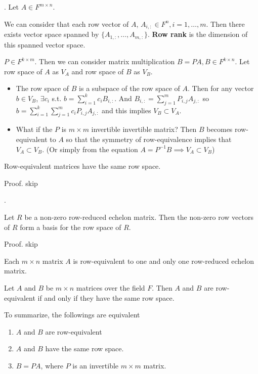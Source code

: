 \documentclass[8pt]{beamer}
\newcommand{\tb}[1]{\textbf{#1}}
\begin{document}
\begin{frame}{.}
    Let $A \in F^{m \times n}$.

    \begin{definition}
        We can consider that each row vector of $A$, $A_{i,:} \in F^{n}, i=1, \dots, m$. Then there exists vector space spanned by $\{A_{1, :}, \dots, A_{m, :}\}$. \tb{Row rank} is the dimension of this spanned vector space.
    \end{definition}

     $P \in F^{k \times m}$. Then we can consider matrix multiplication  $B = PA, B \in F^{k \times n}$. Let row space of $A$ as $V_A$ and row space of $B$ as $V_B$.

     \begin{itemize}
        \item The row space of $B$ is a subspace of the row space of $A$.
        Then for any vector $b \in V_B$, $\exists c_i$ s.t. $b = \sum_{i=1}^k c_i B_{i, :}$. 
        And $B_{i,:} = \sum_{j=1}^m P_{i, j} A_{j, :}$ so $b = \sum_{i=1}^k \sum_{j=1}^m c_i P_{i,j} A_{j, :}$ and this implies $V_B \subset V_A$.
        \item What if the $P$ is $m \times m $ invertible invertible matrix?
        Then $B$ becomes row-equivalent to $A$ so that the symmetry of row-equivalence implies that $V_A \subset V_B$. (Or simply from the equation $A = P^{-1} B \implies V_A \subset V_B$)
     \end{itemize}

     \begin{theorem}
        Row-equivalent matrices have the same row space.
     \end{theorem}
     Proof. skip
\end{frame}

\begin{frame}{.}
    \begin{theorem}
        Let $R$ be a non-zero row-reduced echelon matrix. Then the non-zero row vectors of $R$ form a basis for the row space of $R$.
    \end{theorem}
    Proof. skip

    \begin{corollary}
        Each $m \times n$ matrix $A$ is row-equivalent to one and only one row-reduced echelon matrix.
    \end{corollary}

    \begin{corollary}
        Let $A$ and $B$ be $m\times n$ matrices over the field $F$. Then $A$ and $B$ are row-equivalent if and only if they have the same row space.
    \end{corollary}

    To summarize, the followings are equivalent 

    \begin{enumerate}
        \item $A$ and $B$ are row-equivalent
        \item $A$ and $B$ have the same row space.
        \item $B=PA$, where $P$ is an invertible $m \times m$ matrix.
    \end{enumerate}
\end{frame}
\end{document}

